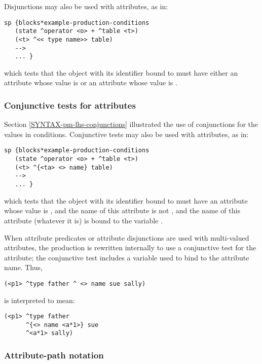 Disjunctions may also be used with attributes, as in:

\begin{verbatim}
sp {blocks*example-production-conditions
   (state ^operator <o> + ^table <t>)
   (<t> ^<< type name>> table)
   -->
   ... }
\end{verbatim}

which tests that the object with its identifier bound to  must have either an attribute  whose value is  or an attribute  whose value is .

\subsubsection*{Conjunctive tests for attributes}

Section \ref{SYNTAX-pm-lhs-conjunctions} illustrated the use of conjunctions for the values in conditions. Conjunctive tests may also be used with attributes, as in:

\begin{verbatim}
sp {blocks*example-production-conditions
   (state ^operator <o> + ^table <t>)
   (<t> ^{<ta> <> name} table)
   -->
   ... }
\end{verbatim}

which tests that the object with its identifier bound to  must have an attribute whose value is , and the name of this attribute is not , and the name of this attribute (whatever it is) is bound to the variable .

When attribute predicates or attribute disjunctions are used with multi-valued attributes, the production is rewritten internally to use a conjunctive test for the attribute; the conjunctive test includes a variable used to bind to the attribute name. Thus,

\begin{verbatim}
(<p1> ^type father ^ <> name sue sally)
\end{verbatim}

is interpreted to mean:

\begin{verbatim}
(<p1> ^type father 
      ^{<> name <a*1>} sue 
      ^<a*1> sally)
\end{verbatim}


\subsubsection{Attribute-path notation}
\label{SYNTAX-pm-lhs-path}

